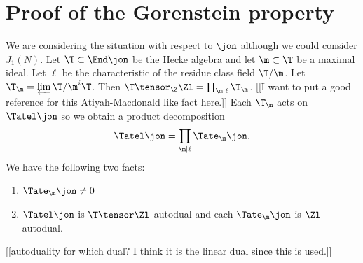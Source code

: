 \documentclass{report}
\begin{document}


\section{Proof of the Gorenstein property}
We are considering the situation with respect to $\jon$ although
we could consider $J_1(N)$.
Let $\T\subset\End\jon$ be the Hecke algebra and let
$\m\subset\T$ be a maximal ideal. Let $\ell$ be the
characteristic of the residue class field $\T/\m$.
Let $\T_\m=\varprojlim\T/\m^i\T$.
Then $\T\tensor_{\Z}\Zl=\prod_{\m|\ell}\T_\m$. [[I want to
put a good reference for this Atiyah-Macdonald like fact here.]]
Each $\T_\m$ acts on $\Tatel \jon$ so we obtain a product decomposition
$$\Tatel \jon =\prod_{\m|\ell}\Tate_\m \jon.$$
We have the following two facts:
\begin{enumerate}
\item $\Tate_\m\jon\neq 0$
\item $\Tatel\jon$ is $\T\tensor\Zl$-autodual and
each $\Tate_\m\jon$ is $\Zl$-autodual.
\end{enumerate}
[[autoduality for which dual? I think it is the linear
dual since this is used.]]
\end{document}
